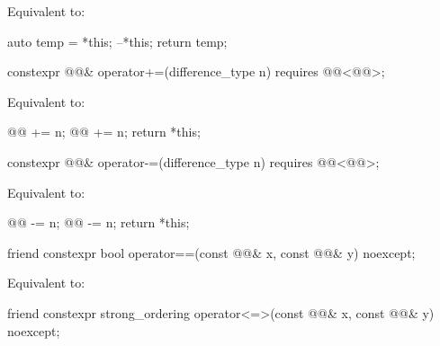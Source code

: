 \begin{itemdescr}
\pnum
\effects
Equivalent to:
\begin{codeblock}
auto temp = *this;
--*this;
return temp;
\end{codeblock}
\end{itemdescr}

%
\begin{itemdecl}
constexpr @@& operator+=(difference_type n)
  requires @@<@@>;
\end{itemdecl}

\begin{itemdescr}
\pnum
\effects
Equivalent to:
\begin{codeblock}
@@ += n;
@@ += n;
return *this;
\end{codeblock}
\end{itemdescr}

%
\begin{itemdecl}
constexpr @@& operator-=(difference_type n)
  requires @@<@@>;
\end{itemdecl}

\begin{itemdescr}
\pnum
\effects
Equivalent to:
\begin{codeblock}
@@ -= n;
@@ -= n;
return *this;
\end{codeblock}
\end{itemdescr}

%
\begin{itemdecl}
friend constexpr bool operator==(const @@& x, const @@& y) noexcept;
\end{itemdecl}

\begin{itemdescr}
\pnum
\effects
Equivalent to: 
\end{itemdescr}

%
\begin{itemdecl}
friend constexpr strong_ordering operator<=>(const @@& x, const @@& y) noexcept;
\end{itemdecl}

